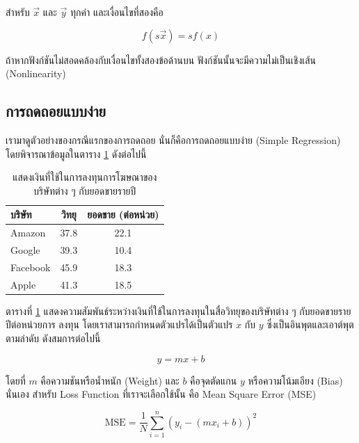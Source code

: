 \noindent สำหรับ $\vec{x}$ และ $\vec{y}$ ทุกค่า และเงื่อนไขที่สองคือ

\begin{equation}
    f(s\vec{x}) = sf(x)
\end{equation}

\noindent ถ้าหากฟังก์ชันไม่สอดคล้องกับเงื่อนไขทั้งสองข้อด้านบน ฟังก์ชันนั้นจะมีความไม่เป็นเชิงเส้น (Nonlinearity)

\subsection{การถดถอยแบบง่าย}
\label{ssec:simple_lin_res}

เรามาดูตัวอย่างของกรณีแรกของการถดถอย นั่นก็คือการถดถอยแบบง่าย (Simple Regression) โดยพิจารณาข้อมูลในตาราง 
\ref{tab:simple_reg_data} ดังต่อไปนี้ 

\begin{table}[htbp]
    \centering
    \caption{แสดงเงินที่ใช้ในการลงทุนการโฆษณาของบริษัทต่าง ๆ กับยอดขายรายปี}
    \label{tab:simple_reg_data}
    \small
    \begin{tabular}{lcc}\toprule
    \textbf{บริษัท} &\textbf{วิทยุ} &\textbf{ยอดขาย (ต่อหน่วย)} \\\midrule
    Amazon &37.8 &22.1 \\
    Google &39.3 &10.4 \\
    Facebook &45.9 &18.3 \\
    Apple &41.3 &18.5 \\
    \bottomrule
    \end{tabular}
\end{table}

ตารางที่ \ref{tab:simple_reg_data} แสดงความสัมพันธ์ระหว่างเงินที่ใช้ในการลงทุนในสื่อวิทยุของบริษัทต่าง ๆ กับยอดขายรายปีต่อหน่วยการ%
ลงทุน โดยเราสามารถกำหนดตัวแปรได้เป็นตัวแปร $x$ กับ $y$ ซึ่งเป็นอินพุตและเอาต์พุตตามลำดับ ดังสมการต่อไปนี้

\begin{equation}
    y = mx + b
\end{equation}

\noindent โดยที่ $m$ คือความชันหรือน้ำหนัก (Weight) และ $b$ คือจุดตัดแกน $y$ หรือความโน้มเอียง (Bias) นั่นเอง สำหรับ Loss 
Function ที่เราจะเลือกใช้นั้น คือ Mean Square Error (MSE)

\begin{equation}
    \text{MSE} = \frac{1}{N} \sum_{i=1}^{n} (y_i - (m x_i + b))^2
\end{equation}


